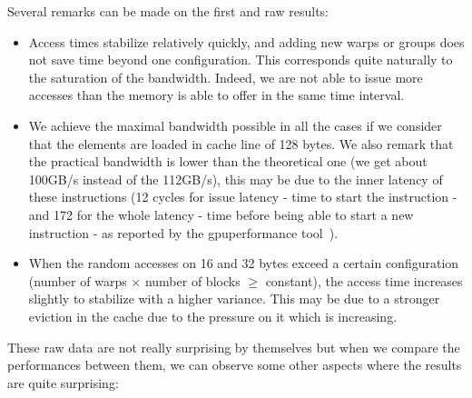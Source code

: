 Several remarks can be made on the first and raw results:
\begin{itemize}
    \item Access times stabilize relatively quickly, and adding new warps or groups does not save time beyond one configuration. This corresponds quite naturally to the saturation of the bandwidth. Indeed, we are not able to issue more accesses than the memory is able to offer in the same time interval.
    \item We achieve the maximal bandwidth possible in all the cases if we consider that the elements are loaded in cache line of 128 bytes. We also remark that the practical bandwidth is lower than the theoretical one (we get about 100GB/s instead of the 112GB/s), this may be due to the inner latency of these instructions (12 cycles for issue latency - time to start the instruction - and 172 for the whole latency - time before being able to start a new instruction - as reported by the gpuperformance tool~\cite{gpuperformance}).
    \item When the random accesses on 16 and 32 bytes exceed a certain configuration (number of warps $\times$ number of blocks $\geq$ constant), the access time increases slightly to stabilize with a higher variance. This may be due to a stronger eviction in the cache due to the pressure on it which is increasing.\\
\end{itemize}

These raw data are not really surprising by themselves but when we compare the performances between them, we can observe some other aspects where the results are quite surprising:

